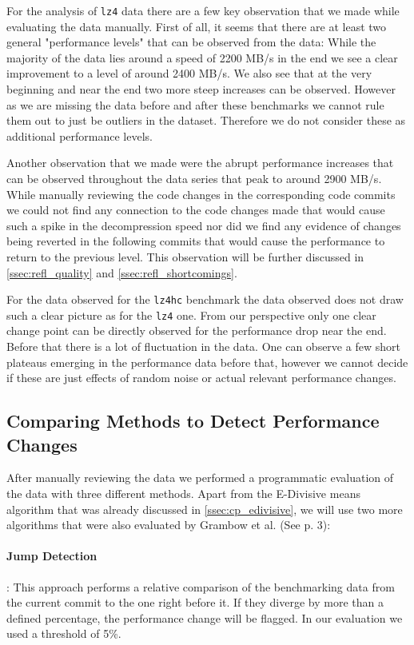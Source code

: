 \documentclass[	runningheads,
				a4paper]{llncs}
\begin{document}
For the analysis of \texttt{lz4} data there are a few key observation that we made while evaluating the data manually. First of all, it seems that there are at least two general "performance levels" that can be observed from the data: While the majority of the data lies around a speed of 2200 MB/s in the end we see a clear improvement to a level of around 2400 MB/s. We also see that at the very beginning and near the end two more steep increases can be observed. However as we are missing the data before and after these benchmarks we cannot rule them out to just be outliers in the dataset. Therefore we do not consider these as additional performance levels.

Another observation that we made were the abrupt performance increases that can be observed throughout the data series that peak to around 2900 MB/s. While manually reviewing the code changes in the corresponding code commits we could not find any connection to the code changes made that would cause such a spike in the decompression speed nor did we find any evidence of changes being reverted in the following commits that would cause the performance to return to the previous level. This observation will be further discussed in \autoref{ssec:refl_quality} and \autoref{ssec:refl_shortcomings}.

For the data observed for the \texttt{lz4hc} benchmark the data observed does not draw such a clear picture as for the \texttt{lz4} one. From our perspective only one clear change point can be directly observed for the performance drop near the end. Before that there is a lot of fluctuation in the data. One can observe a few short plateaus emerging in the performance data before that, however we cannot decide if these are just effects of random noise or actual relevant performance changes.

\subsection{Comparing Methods to Detect Performance Changes}
After manually reviewing the data we performed a programmatic evaluation of the data with three different methods. Apart from the E-Divisive means algorithm that was already discussed in \autoref{ssec:cp_edivisive}, we will use two more algorithms that were also evaluated by Grambow et al. (See \cite{grambow2019} p. 3):

\paragraph{Jump Detection}: This approach performs a relative comparison of the benchmarking data from the current commit to the one right before it. If they diverge by more than a defined percentage, the performance change will be flagged. In our evaluation we used a threshold of 5\%.
\end{document}
